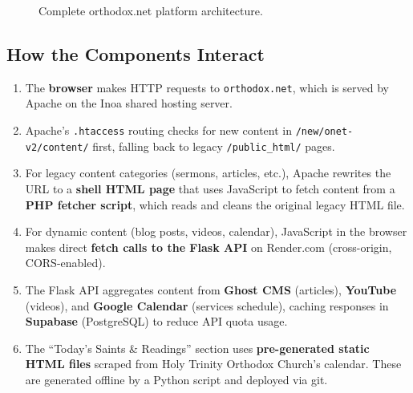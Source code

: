 \documentclass[12pt]{article}
\begin{document}
\begin{figure}[ht]
{%
}
\caption{Complete orthodox.net platform architecture.}
\label{fig:platform-arch}
\end{figure}

\subsection{How the Components Interact}

\begin{enumerate}
    \item The \textbf{browser} makes HTTP requests to \texttt{orthodox.net}, which is served by Apache on the Inoa shared hosting server.
    \item Apache's \texttt{.htaccess} routing checks for new content in \texttt{/new/onet-v2/content/} first, falling back to legacy \texttt{/public\_html/} pages.
    \item For legacy content categories (sermons, articles, etc.), Apache rewrites the URL to a \textbf{shell HTML page} that uses JavaScript to fetch content from a \textbf{PHP fetcher script}, which reads and cleans the original legacy HTML file.
    \item For dynamic content (blog posts, videos, calendar), JavaScript in the browser makes direct \textbf{fetch calls to the Flask API} on Render.com (cross-origin, CORS-enabled).
    \item The Flask API aggregates content from \textbf{Ghost CMS} (articles), \textbf{YouTube} (videos), and \textbf{Google Calendar} (services schedule), caching responses in \textbf{Supabase} (PostgreSQL) to reduce API quota usage.
    \item The ``Today's Saints \& Readings'' section uses \textbf{pre-generated static HTML files} scraped from Holy Trinity Orthodox Church's calendar. These are generated offline by a Python script and deployed via git.
\end{enumerate}
\end{document}
